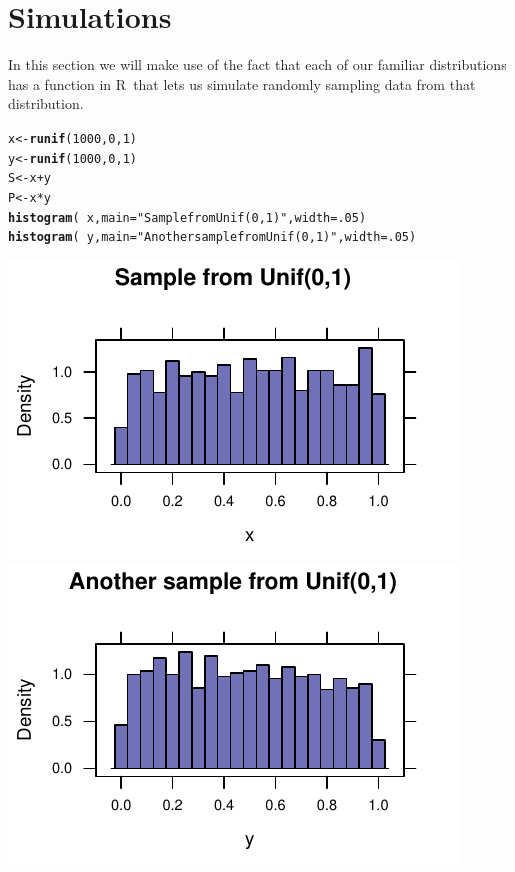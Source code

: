 \documentclass[twoside]{book}\usepackage[]{graphicx}\usepackage[]{xcolor}
\makeatletter
\def\maxwidth{ %
  \ifdim\Gin@nat@width>\linewidth
    \linewidth
  \else
    \Gin@nat@width
  \fi
}
\newcommand{\hlnum}[1]{\textcolor[rgb]{0.686,0.059,0.569}{#1}}%
\newcommand{\hlstr}[1]{\textcolor[rgb]{0.192,0.494,0.8}{#1}}%
\newcommand{\hlopt}[1]{\textcolor[rgb]{0,0,0}{#1}}%
\newcommand{\hlstd}[1]{\textcolor[rgb]{0.345,0.345,0.345}{#1}}%
\newcommand{\hlkwb}[1]{\textcolor[rgb]{0.69,0.353,0.396}{#1}}%
\newcommand{\hlkwc}[1]{\textcolor[rgb]{0.333,0.667,0.333}{#1}}%
\newcommand{\hlkwd}[1]{\textcolor[rgb]{0.737,0.353,0.396}{\textbf{#1}}}%
\newenvironment{kframe}{%
 \def\at@end@of@kframe{}%
 \ifinner\ifhmode%
  \def\at@end@of@kframe{\end{minipage}}%
  \begin{minipage}{\columnwidth}%
 \fi\fi%
 \def\FrameCommand##1{\hskip\@totalleftmargin \hskip-\fboxsep
 \colorbox{shadecolor}{##1}\hskip-\fboxsep
     \hskip-\linewidth \hskip-\@totalleftmargin \hskip\columnwidth}%
 \MakeFramed {\advance\hsize-\width
   \@totalleftmargin\z@ \linewidth\hsize
   \@setminipage}}%
 {\par\unskip\endMakeFramed%
 \at@end@of@kframe}
\newenvironment{knitrout}{}{} %
\def\R{{\sf R}}
\makeatother
\begin{document}
\section{Simulations}

In this section we will make use of the fact that each of our familiar distributions
has a function in \R\ that lets us simulate randomly sampling data from that distribution.
\begin{knitrout}
\color{fgcolor}\begin{kframe}
\begin{alltt}
\hlstd{x} \hlkwb{<-} \hlkwd{runif}\hlstd{(} \hlnum{1000}\hlstd{,} \hlnum{0}\hlstd{,}\hlnum{1} \hlstd{)}
\hlstd{y} \hlkwb{<-} \hlkwd{runif}\hlstd{(} \hlnum{1000}\hlstd{,} \hlnum{0}\hlstd{,}\hlnum{1} \hlstd{)}
\hlstd{S} \hlkwb{<-} \hlstd{x} \hlopt{+} \hlstd{y}
\hlstd{P} \hlkwb{<-} \hlstd{x} \hlopt{*} \hlstd{y}
\hlkwd{histogram}\hlstd{(} \hlopt{~} \hlstd{x ,} \hlkwc{main}\hlstd{=}\hlstr{"Sample from Unif(0,1)"}\hlstd{,} \hlkwc{width}\hlstd{=}\hlnum{.05}\hlstd{)}
\hlkwd{histogram}\hlstd{(} \hlopt{~} \hlstd{y ,} \hlkwc{main}\hlstd{=}\hlstr{"Another sample from Unif(0,1)"}\hlstd{,} \hlkwc{width}\hlstd{=}\hlnum{.05}\hlstd{)}
\end{alltt}
\end{kframe}

{\centering \includegraphics[width=\maxwidth]{figures/fig-runif-1} 
\includegraphics[width=\maxwidth]{figures/fig-runif-2} 

}



\end{knitrout}
\end{document}

